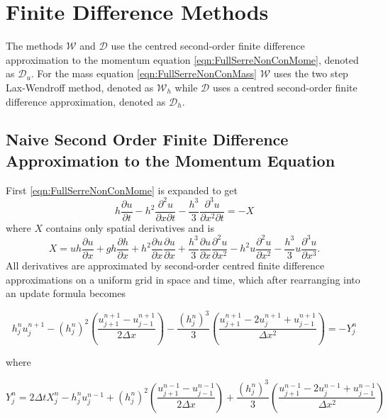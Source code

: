 
\chapter{Finite Difference Methods}
\label{chp:NumMethod}


The methods $\mathcal{W}$ and $\mathcal{D}$ use the centred second-order finite difference approximation to the momentum equation \eqref{eqn:FullSerreNonConMome}, denoted as $\mathcal{D}_u$. For the mass equation \eqref{eqn:FullSerreNonConMass} $\mathcal{W}$ uses the two step Lax-Wendroff method, denoted as $\mathcal{W}_h$ while $\mathcal{D}$ uses a centred second-order finite difference approximation, denoted as $\mathcal{D}_h$.

\section{Naive Second Order Finite Difference Approximation to the Momentum Equation}
First \eqref{eqn:FullSerreNonConMome} is expanded to get
\begin{equation*}
h\dfrac{\partial u}{\partial t} - h^2\frac{\partial^2 u}{\partial x \partial t} - \frac{h^3}{3}\frac{\partial^3 u}{\partial x^2 \partial t}  = -X 
\label{eq:expandedu}
\end{equation*}
where $X$ contains only spatial derivatives and is
\begin{equation*}
X = uh\frac{\partial u}{\partial x} + gh\frac{\partial h}{\partial x} + h^2\frac{\partial u}{\partial x}\frac{\partial u}{\partial x} + \frac{h^3}{3}\frac{\partial u}{\partial x}\frac{\partial^2 u}{\partial x^2} - h^2u\frac{\partial^2 u}{\partial x^2}- \frac{h^3}{3}u\frac{\partial^3 u}{\partial x^3} .
\end{equation*}
All derivatives are approximated by second-order centred finite difference approximations on a uniform grid in space and time, which after rearranging into an update formula becomes

\begin{equation}
h^{n}_ju^{n+1}_j - \left(h^{n}_j\right)^2 \left(\frac{u^{n+1}_{j+1} -u^{n+1}_{j-1} }{2 \Delta x}\right) - \frac{\left(h^{n}_j\right)^3}{3}\left(\frac{u^{n+1}_{j+1} - 2u^{n+1}_{j} + u^{n+1}_{j-1} }{\Delta x^2}\right) = - Y^n_j
\label{eq:expandedutdisc3}
\end{equation}

where

\begin{equation*}
Y_j^n = 2\Delta tX_j^{n} - h_j^{n}u_j^{n-1} + \left(h_j^{n}\right)^2\left(\frac{u^{n-1}_{j+1} -u^{n-1}_{j-1} }{2 \Delta x}\right) + \frac{\left(h_j^{n}\right)^3}{3}\left(\frac{u^{n-1}_{j+1} - 2u^{n-1}_{j} + u^{n-1}_{j-1} }{\Delta x^2}\right)
\label{eq:expandfactor Xp}
\end{equation*}

